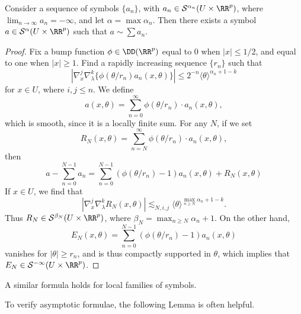 \begin{theorem}
    Consider a sequence of symbols $\{ a_n \}$, with $a_n \in \mathcal{S}^{\alpha_n}(U \times \RR^p)$, where $\lim_{n \to \infty} a_n = -\infty$, and let $\alpha = \max \alpha_n$. Then there exists a symbol $a \in \mathcal{S}^\alpha(U \times \RR^p)$ such that $a \sim \sum a_n$.
\end{theorem}
\begin{proof}
    Fix a bump function $\phi \in \DD(\RR^p)$ equal to 0 when $|x| \leq 1/2$, and equal to one when $|x| \geq 1$. Find a rapidly increasing sequence $\{ r_n \}$ such that
    \[ | \nabla_x^j \nabla_\lambda^k \{ \phi( \theta / r_n ) a_n(x,\theta) \} | \leq 2^{-n} \langle \theta \rangle^{\alpha_n + 1 - k} \]
    for $x \in U$, where $i,j \leq n$. We define
    \[ a(x,\theta) = \sum_{n = 0}^\infty \phi(\theta / r_n) \cdot a_n(x,\theta), \]
    which is smooth, since it is a locally finite sum. For any $N$, if we set
    \[ R_N(x,\theta) = \sum_{n = N}^\infty \phi(\theta / r_n) \cdot a_n(x,\theta), \]
    then
    \[ a - \sum_{n = 0}^{N-1} a_n = \sum_{n = 0}^{N-1} (\phi(\theta/r_n) - 1) a_n(x,\theta) + R_N(x,\theta) \]
    If $x \in U$, we find that
    \[ | \nabla_x^j \nabla_\lambda^k R_N(x,\theta) | \lesssim_{N,i,j} \langle \theta \rangle^{\max_{n \geq N} \alpha_n + 1 - k}. \]
    Thus $R_N \in \mathcal{S}^{\beta_N}(U \times \RR^p)$, where $\beta_N = \max_{n \geq N} \alpha_n + 1$. On the other hand,
    \[ E_N(x,\theta) = \sum_{n = 0}^{N-1} (\phi(\theta/r_n) - 1) a_n(x,\theta) \]
    vanishes for $|\theta| \geq r_n$, and is thus compactly supported in $\theta$, which implies that $E_N \in \mathcal{S}^{-\infty}(U \times \RR^p)$.
\end{proof}

\begin{remark}
    A similar formula holds for local families of symbols.
\end{remark}

To verify asymptotic formulae, the following Lemma is often helpful.

